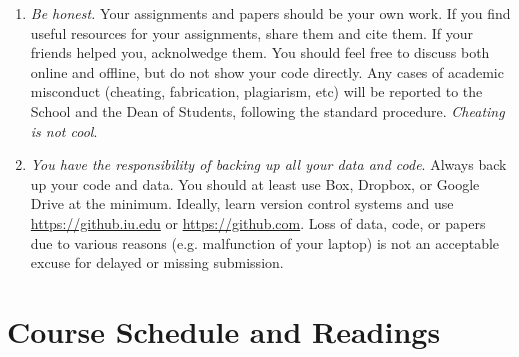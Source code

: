 \documentclass[11pt,article,oneside]{memoir} %
\begin{document}
\begin{enumerate}

\item \emph{Be honest.} Your assignments and papers should be your own work.  
If you find useful resources for your assignments, share them and cite them. 
If your friends helped you, acknolwedge them. 
You should feel free to discuss both online and offline, but do not show your code directly.  
Any cases of academic misconduct (cheating, fabrication, plagiarism, etc) will be reported to the School and the Dean of Students, following the standard procedure. 
\emph{Cheating is not cool}. 

\item \emph{You have the responsibility of backing up all your data and code}.
Always back up your code and data. You should at least use Box, Dropbox, or Google Drive at the minimum.
Ideally, learn version control systems and use \url{https://github.iu.edu} or \url{https://github.com}. 
Loss of data, code, or papers due to various reasons (e.g. malfunction of your laptop) is not an acceptable excuse for delayed or missing submission. 





\end{enumerate}%
\section{Course Schedule and Readings}%
\end{document}
